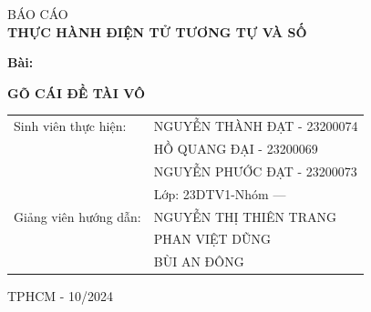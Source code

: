 \begin{titlepage}
\begin{center}
\fontsize{24pt}{0pt}\selectfont BÁO CÁO \\
\vspace{12pt}
\textbf{\fontsize{32pt}{0pt}\selectfont THỰC HÀNH ĐIỆN TỬ TƯƠNG TỰ VÀ SỐ   }
\end{center}
\vspace{1cm}
\hspace{6pt}\textbf{\fontsize{14pt}{0pt}\selectfont Bài:}
\begin{center}
    \textbf{\fontsize{20pt}{0pt}\selectfont GÕ CÁI ĐỀ TÀI VÔ}
\end{center}
\vspace{1cm}
\begin{table}[H]
    \centering
    \begin{tabular}{l l}
       \fontsize{14pt}{0pt}\selectfont Sinh viên thực hiện: &  \fontsize{14pt}{0pt}\selectfont NGUYỄN THÀNH ĐẠT - 23200074\\
         & \fontsize{14pt}{0pt}\selectfont HỒ QUANG ĐẠI - 23200069 \\
         & \fontsize{14pt}{0pt}\selectfont NGUYỄN PHƯỚC ĐẠT - 23200073\\
         & \fontsize{14pt}{0pt}\selectfont Lớp: 23DTV1-Nhóm --- \\
        \fontsize{14pt}{0pt}\selectfont Giảng viên hướng dẫn: & \fontsize{14pt}{0pt}\selectfont NGUYỄN THỊ THIÊN TRANG\\
        & \fontsize{14pt}{0pt}\selectfont PHAN VIỆT DŨNG\\
        & \fontsize{14pt}{0pt}\selectfont BÙI AN ĐÔNG
    \end{tabular}
\end{table}
\vspace{1cm}
\begin{center}
    \fontsize{14pt}{0pt}\selectfont TPHCM - 10/2024
\end{center}
\end{titlepage}
